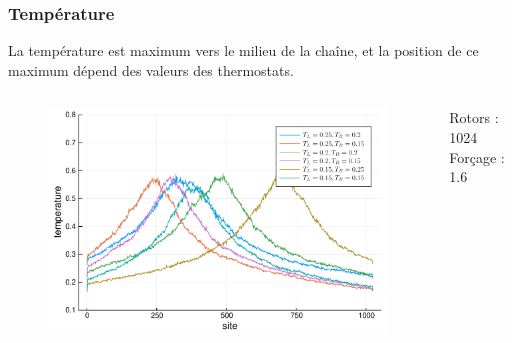 \begin{frame}

    \frametitle{Température}

    La température est maximum vers le milieu de la chaîne, et
    la position de ce maximum dépend des valeurs des thermostats.

    \begin{columns}

        \begin{column}{0.8\textwidth}
            \begin{figure}
                \includegraphics[scale=0.4]{plots/temperature.pdf}
            \end{figure}
        \end{column}

        \begin{column}{0.2\textwidth}
            \scriptsize
            Rotors : 1024
            Forçage : 1.6
        \end{column}

    \end{columns}

\end{frame}

